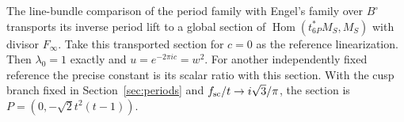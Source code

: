 \begin{proposition}[FAM B.1.4; T]\label{fam:B.1.4}
The line-bundle comparison of the period family with Engel's family over $B^\circ$ transports its inverse period lift to a global section of $\operatorname{Hom}(t_{6P}^*M_S,M_S)$ with divisor $F_\infty$. Take this transported section for $c=0$ as the reference linearization. Then $\lambda_0=1$ exactly and $u=e^{-2\pi ic}=w^2$. For another independently fixed reference the precise constant is its scalar ratio with this section. With the cusp branch fixed in Section~\ref{sec:periods} and $f_{\rm sc}/t\to i\sqrt3/\pi$, the section is $P=(0,-\sqrt2t^2(t-1))$.
\end{proposition}
